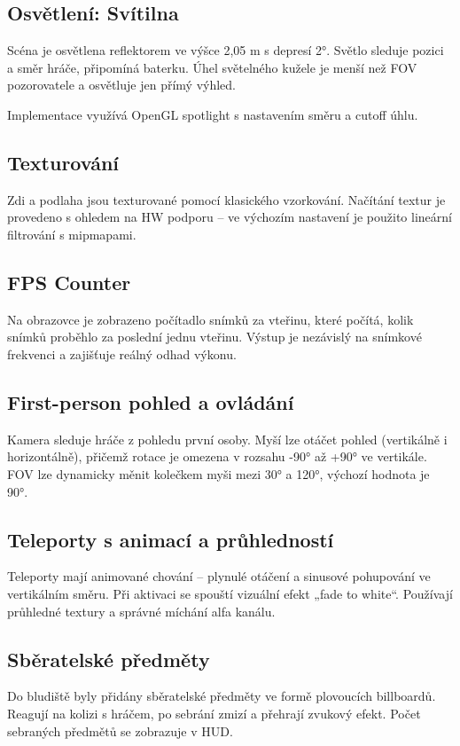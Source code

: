 \documentclass[12pt,a4paper]{article}
\begin{document}
\newpage
\subsection*{Osvětlení: Svítilna}
Scéna je osvětlena reflektorem ve výšce 2{,}05 m s depresí 2°. Světlo sleduje pozici a směr hráče, připomíná baterku. Úhel světelného kužele je menší než FOV pozorovatele a osvětluje jen přímý výhled.

Implementace využívá OpenGL spotlight s nastavením směru a cutoff úhlu.

\subsection*{Texturování}
Zdi a podlaha jsou texturované pomocí klasického vzorkování. Načítání textur je provedeno s ohledem na HW podporu – ve výchozím nastavení je použito lineární filtrování s mipmapami.

\subsection*{FPS Counter}
Na obrazovce je zobrazeno počítadlo snímků za vteřinu, které počítá, kolik snímků proběhlo za poslední jednu vteřinu. Výstup je nezávislý na snímkové frekvenci a zajišťuje reálný odhad výkonu.

\subsection*{First-person pohled a ovládání}
Kamera sleduje hráče z pohledu první osoby. Myší lze otáčet pohled (vertikálně i horizontálně), přičemž rotace je omezena v rozsahu -90° až +90° ve vertikále. FOV lze dynamicky měnit kolečkem myši mezi 30° a 120°, výchozí hodnota je 90°.

\subsection*{Teleporty s animací a průhledností}
Teleporty mají animované chování – plynulé otáčení a sinusové pohupování ve vertikálním směru. Při aktivaci se spouští vizuální efekt „fade to white“. Používají průhledné textury a správné míchání alfa kanálu.

\subsection*{Sběratelské předměty}
Do bludiště byly přidány sběratelské předměty ve formě plovoucích billboardů. Reagují na kolizi s hráčem, po sebrání zmizí a přehrají zvukový efekt. Počet sebraných předmětů se zobrazuje v HUD.
\end{document}
